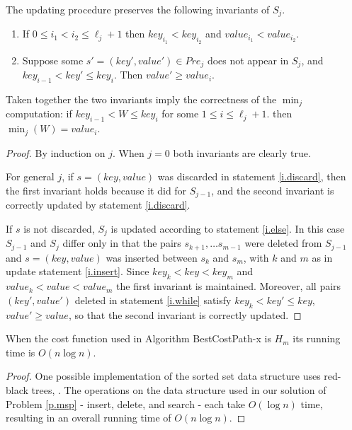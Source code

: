 \begin{theorem}\label{p.kmu} The updating procedure preserves the following invariants of $S_j$.
  \begin{enumerate}
  	\item If $0\leq i_1< i_2 \leq \ell_j+1$ then $key_{i_1}< key_{i_2}$ and 
  	$value_{i_1} < value_{i_2}$.
  	\item Suppose some $s'=(key',value') \in Pre_j$ does not appear in $S_j$, and
  	$key_{i-1} < key' \leq key_i$. Then $value'\geq value_i$.
   \end{enumerate}
   Taken together the two invariants imply the correctness of the $\min_j$ computation: if $key_{i-1}<W\leq key_{i}$ for some $1\leq i \leq \ell_j+1$. then 
  	$\min_j(W)=value_{i}$.
\end{theorem}
\begin{proof}
By induction on $j$. When $j=0$ both invariants are clearly true.

For general $j$, if $s=(key,value)$ was discarded in statement \ref{i.discard}, then the first invariant holds because it did for $S_{j-1}$, and the second invariant is correctly updated
by statement \ref{i.discard}. 

If $s$ is not discarded, $S_j$ is updated according to statement \ref{i.else}. In this case $S_{j-1}$ and $S_j$ differ only in that 
the pairs $s_{k+1},\ldots s_{m-1}$ were deleted from $S_{j-1}$ and $s=(key,value)$ was
inserted between $s_k$ and $s_m$, with $k$ and $m$ as in
update statement \ref{i.insert}. Since $key_k<key <key_m$ and 
$value_k < value <value_m$ the first invariant is maintained.
Moreover, all pairs $(key',value')$
deleted in statement \ref{i.while}
satisfy $key_k<key'\leq key$, $value'\geq value$, so that the second invariant is correctly
updated.
\end{proof}
\begin{theorem}\label{t.linear-m}
	When the cost function used in Algorithm BestCostPath-x is $H_m$ its running time is $O(n\log n)$.
\end{theorem}
\begin{proof}
One possible implementation of the sorted set data structure uses red-black trees, \cite{guibas}.
The operations on the data structure used in our solution of Problem \ref{p.msp} -  insert, delete, and search - each take $O(\log n)$ time, resulting 
in an overall running time of $O(n \log n)$.
\end{proof}


